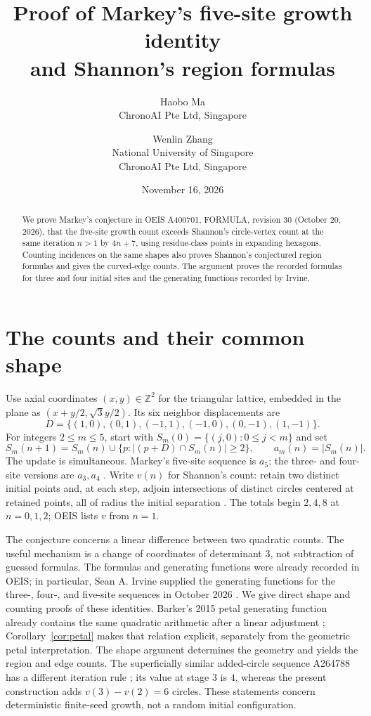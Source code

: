 \documentclass[11pt]{article}
\title{Proof of Markey's five-site growth identity\\and Shannon's region formulas}
\author{Haobo Ma\\\small ChronoAI Pte Ltd, Singapore
\and Wenlin Zhang\\\small National University of Singapore\\\small ChronoAI Pte Ltd, Singapore}
\date{November 16, 2026}
\newcommand{\Z}{\mathbb Z}
\begin{document}
\maketitle
\begin{abstract}
We prove Markey's conjecture in OEIS A400701, FORMULA, revision 30
(October 20, 2026), that the five-site growth count exceeds Shannon's
circle-vertex count at the same iteration $n>1$ by $4n+7$, using
residue-class points in expanding hexagons.
Counting incidences on the same shapes also proves Shannon's conjectured
region formulas and gives the curved-edge counts. The argument proves
the recorded formulas for three and four initial sites and the
generating functions recorded by Irvine.
\end{abstract}

\section{The counts and their common shape}
Use axial coordinates $(x,y)\in\Z^2$ for the triangular lattice, embedded in
the plane as $(x+y/2,\sqrt3y/2)$. Its six neighbor displacements are
\[
 D=\{(1,0),(0,1),(-1,1),(-1,0),(0,-1),(1,-1)\}.
\]
For integers $2\leq m\leq5$, start with $S_m(0)=\{(j,0):0\leq j<m\}$ and set
\[
 S_m(n+1)=S_m(n)\cup\{p: |(p+D)\cap S_m(n)|\geq2\},\qquad
 a_m(n)=|S_m(n)|.
\]
The update is simultaneous. Markey's five-site sequence is $a_5$;
the three- and four-site versions are $a_3,a_4$ \cite{markey,three,four}.
Write $v(n)$ for Shannon's count: retain two distinct initial points and, at
each step, adjoin intersections of distinct circles centered at retained
points, all of radius the initial separation \cite{shannon}.
The totals begin $2,4,8$ at $n=0,1,2$; OEIS lists $v$ from $n=1$.

The conjecture concerns a linear difference between two quadratic counts.
The useful mechanism is a change of coordinates of determinant $3$, not
subtraction of guessed formulas. The formulas and generating functions were
already recorded in OEIS; in particular, Sean A. Irvine supplied the
generating functions for the three-, four-, and five-site sequences in
October 2026 \cite{markey,three,four}. We give direct shape and counting
proofs of these identities. Barker's 2015 petal generating function
already contains the same quadratic arithmetic after a linear adjustment
\cite{petals}; Corollary~\ref{cor:petal} makes that relation explicit,
separately from the geometric petal interpretation.
The shape argument determines the geometry and yields the region and
edge counts. The superficially
similar added-circle sequence A264788 has a different iteration rule
\cite{circles}; its value at stage $3$ is $4$, whereas the present
construction adds $v(3)-v(2)=6$ circles. These statements concern deterministic finite-seed growth,
not a random initial configuration.
\end{document}
